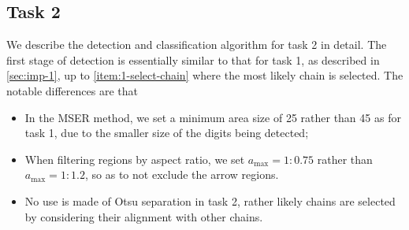 \documentclass{article}
\begin{document}
\clearpage

\subsection{Task 2}
\label{sec:imp-2}

We describe the detection and classification algorithm for task 2 in detail.
The first stage of detection is essentially similar to that for task 1, as
described in \autoref{sec:imp-1}, up to \autoref{item:1-select-chain} where the
most likely chain is selected.
The notable differences are that
\begin{itemize}
\item
  In the MSER method, we set a minimum area size of 25 rather than 45 as for
  task 1, due to the smaller size of the digits being detected;

\item
  When filtering regions by aspect ratio, we set $a_{\max} = 1:0.75$ rather
  than $a_{\max} = 1:1.2$, so as to not exclude the arrow regions.

\item
  No use is made of Otsu separation in task 2, rather likely chains are selected
  by considering their alignment with other chains.
\end{itemize}
\end{document}
